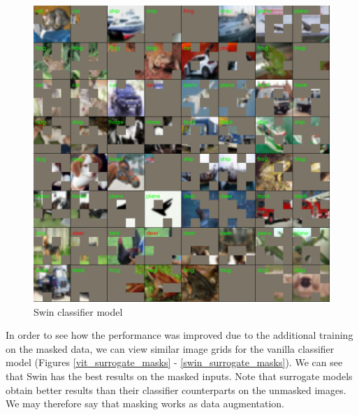 \documentclass[magisterska,en]{pracamgr}
\begin{document}
\begin{figure}[H]
\centering
\includegraphics[scale=0.5]{./images/swin_classifier_masks.png}
\caption{Swin classifier model}
\label{swin_classifier_masks}
\end{figure}




In order to see how the performance was improved due to the additional training on the masked data, we can view similar image grids for the vanilla classifier model (Figures \ref{vit_surrogate_masks} - \ref{swin_surrogate_masks}). We can see that Swin has the best results on the masked inputs. Note that surrogate models obtain better results than their classifier counterparts on the unmasked images. We may therefore say that masking works as data augmentation.
\end{document}
